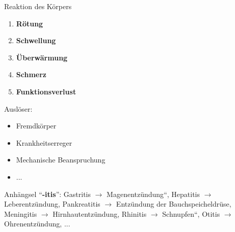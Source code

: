 \documentclass{article}
\newcommand\gEs[1]{\textbf{\textcolor[rgb]{0.0,0.0,0.5019608}{#1}}}
\newcommand\gEs[1]{\textbf{\textcolor[rgb]{0.0,0.0,0.5019608}{#1}}}
\newcommand\gT[1]{\textbf{\textup{\textcolor[rgb]{0.0,0.5019608,0.0}{#1}}}}
\begin{document}
{\mdseries
Reaktion des K\"orpers}

\begin{enumerate}
\item \gEs{R\"otung }

\item \gEs{Schwellung }

\item \gEs{\"Uberw\"armung }

\item \gEs{Schmerz }

\item \gEs{Funktionsverlust }

\end{enumerate}
{\mdseries
Ausl\"oser:}

\begin{itemize}
\item {\mdseries
Fremdk\"orper}

\item {\mdseries
Krankheitserreger}

\item {\mdseries
Mechanische Beanspruchung}

\item {\mdseries
...}

\end{itemize}
{\mdseries
Anh\"angsel
{\textquotedblleft}\gT{{}-itis}{\textquotedblright}:
Gastritis ${\rightarrow}$
{\quotedblbase}Magenentz\"undung{\textquotedblleft}, Hepatitis
${\rightarrow}$ Leberentz\"undung, Pankreatitis ${\rightarrow}$
Entz\"undung der Bauchspeicheldr\"use, Meningitis ${\rightarrow}$
Hirnhautentz\"undung, Rhinitis ${\rightarrow}$
{\quotedblbase}Schnupfen{\textquotedblleft}, Otitis ${\rightarrow}$
Ohrenentz\"undung, ...}
\end{document}
